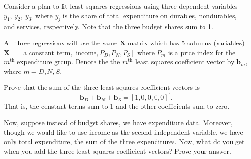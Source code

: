 \documentclass[11pt]{article}
\begin{document}
Consider a plan to fit least squares regressions
using three dependent variables $y_{1},\ y_{2},\ y_{3}$, where $y_{j}$
is the share of total expenditure on durables, nondurables, and services,
respectively. Note that the three budget shares sum to 1. 

All three regressions will use the same $\boldsymbol{X} $ matrix which has 5 columns
(variables) $\boldsymbol{X} =[\text{a constant term},\text{ income},P_{D},P_{N},P_{S}]$
where $P_{m}$ is a price index for the $m^{\text{th}}$ expenditure
group. Denote the the $m^{\text{th}}$ least squares coefficient vector
by $\boldsymbol{b}_{m}$, where  $m=D,N,S$. 

Prove that the sum of the three least squares coefficient vectors
is 
\[
\boldsymbol{b}_{D}+\boldsymbol{b}_{N}+\boldsymbol{b}_{S}=[1,0,0,0,0]^{\prime}.
\]
That is, the constant terms sum to 1 and the other coefficients sum
to zero.

Now, suppose instead of budget shares, we have expenditure data. Moreover,
though we would like to use income as the second independent variable,
we have only total expenditure, the sum of the three expenditures.
Now, what do you get when you add the three least squares coefficient
vectors? Prove your answer.
\end{document}
